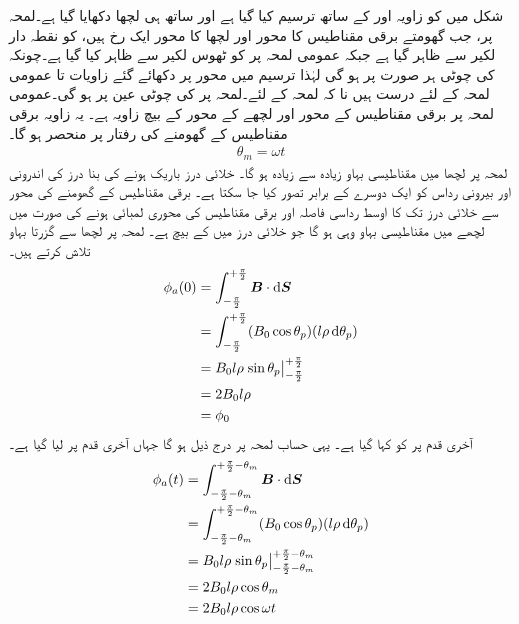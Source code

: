 %
شکل   میں  کو زاویہ  اور   کے ساتھ ترسیم کیا گیا ہے اور ساتھ ہی  لچھا  دکھایا گیا ہے۔لمحہ پر، جب  گھومتے برقی مقناطیس کا محور اور لچھا  کا محور ایک رخ  ہیں،    کو نقطہ دار  لکیر سے ظاہر گیا ہے جبکہ عمومی  لمحہ  پر   کو  ٹھوس لکیر سے   ظاہر کیا گیا ہے۔چونکہ  کی چوٹی ہر صورت  پر ہو گی لہٰذا  ترسیم میں محور  پر دکھائے گئے زاویات  تا  عمومی لمحہ  کے لئے درست  ہیں نا کہ لمحہ  کے لئے۔لمحہ  پر  کی چوٹی عین  پر ہو گی۔عمومی  لمحہ  پر برقی مقناطیس کے محور اور لچھے کے محور کے بیچ  زاویہ ہے۔ یہ زاویہ برقی مقناطیس کے گھومنے کی رفتار  پر منحصر ہو گا۔
\begin{align}
\theta_m=\omega t
\end{align}
لمحہ  پر لچھا  میں   مقناطیسی بہاو زیادہ سے زیادہ ہو گا۔ خلائی درز باریک ہونے کی بنا درز کی اندرونی اور بیرونی رداس کو ایک دوسرے کے برابر تصور کیا جا سکتا ہے۔ برقی مقناطیس کے گھومنے کی محور سے  خلائی درز تک کا اوسط رداسی فاصلہ  اور  برقی مقناطیس کی محوری لمبائی  ہونے کی صورت میں لچھے میں  مقناطیسی بہاو وہی ہو گا جو  خلائی درز میں    کے بیچ ہے۔ لمحہ  پر  لچھا  سے گزرتا بہاو  تلاش کرتے ہیں۔
\begin{gather}
\begin{aligned}\label{مساوات_گھومتے_مشین_قطب_پر_بہاو}
\phi_a(0)&=\int_{-\frac{\pi}{2}}^{+\frac{\pi}{2}} \kvec{B} \cdot \dif \kvec{S}\\
&=\int_{-\frac{\pi}{2}}^{+\frac{\pi}{2}} (B_0 \cos \theta_p)(l \rho \dif \theta_p)\\
&=B_0 l \rho \left. \sin \theta_p \right\vert_{-\frac{\pi}{2}}^{+\frac{\pi}{2}}\\
&=2 B_0 l \rho\\
&=\phi_0
\end{aligned}
\end{gather}
آخری قدم پر   کو  کہا گیا ہے۔ یہی حساب  لمحہ  پر درج ذیل ہو گا جہاں آخری قدم پر  لیا گیا ہے۔
\begin{gather}
\begin{aligned}
\phi_a(t)&=\int_{-\frac{\pi}{2}-\theta_m}^{+\frac{\pi}{2}-\theta_m} \kvec{B} \cdot \dif \kvec{S}\\
&=\int_{-\frac{\pi}{2}-\theta_m}^{+\frac{\pi}{2}-\theta_m} (B_0 \cos \theta_p)(l \rho \dif \theta_p)\\
&=B_0 l \rho \left. \sin \theta_p \right\vert_{-\frac{\pi}{2}-\theta_m}^{+\frac{\pi}{2}-\theta_m}\\
&=2 B_0 l \rho \cos \theta_m\\
&=2 B_0 l \rho \cos \omega t
\end{aligned}
\end{gather}
